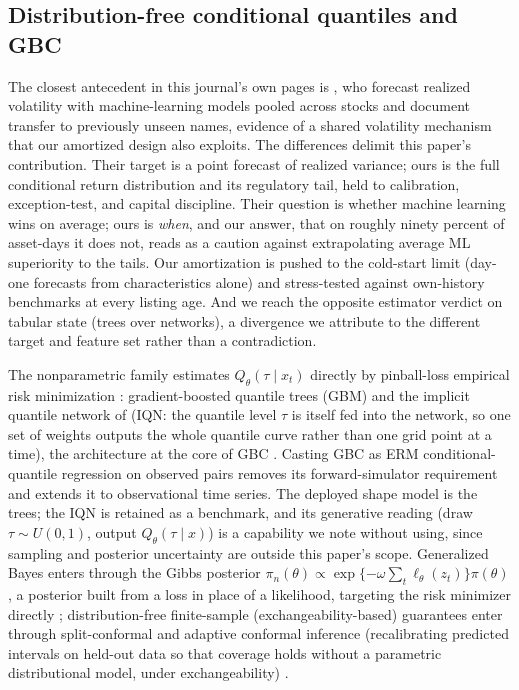 \documentclass[11pt]{article}
\theoremstyle{remark}
\begin{document}
\subsection{Distribution-free conditional quantiles and GBC}

The closest antecedent in this journal's own pages is
\citet{zhang2024commonality}, who forecast realized volatility with
machine-learning models pooled across stocks and document transfer to previously unseen names, evidence of a shared volatility mechanism
that our amortized design also exploits. The differences delimit this
paper's contribution. Their target is a point forecast of realized
variance; ours is the full conditional return distribution and its
regulatory tail, held to calibration, exception-test, and capital
discipline. Their question is whether machine learning wins on average;
ours is \emph{when}, and our answer, that on roughly ninety percent
of asset-days it does not, reads as a caution against extrapolating
average ML superiority to the tails. Our amortization is pushed to the
cold-start limit (day-one forecasts from characteristics alone) and
stress-tested against own-history benchmarks at every listing age. And
we reach the opposite estimator verdict on tabular state (trees over
networks), a divergence we attribute to the different target and feature
set rather than a contradiction.

The nonparametric family estimates $Q_\theta(\tau \mid x_t)$ directly by
pinball-loss empirical risk minimization \citep{koenker1978}:
gradient-boosted quantile
trees (GBM) and the implicit quantile network of \citet{dabney2018iqn}
(IQN: the quantile level $\tau$ is itself fed into the network, so one
set of weights outputs the whole quantile curve rather than one grid
point at a time),
the architecture at the core of GBC \citep{polson2023gbc,
nareklishvili2025gqbp}. Casting GBC as ERM conditional-quantile
regression on observed pairs removes its forward-simulator requirement
and extends it to observational time series. The deployed shape model
is the trees; the IQN is retained as a benchmark, and its generative reading (draw $\tau \sim
U(0,1)$, output $Q_\theta(\tau \mid x)$) is a capability we note
without using, since sampling and posterior uncertainty are outside
this paper's scope. Generalized Bayes enters through the Gibbs
posterior $\pi_n(\theta) \propto
\exp\{-\omega \sum_t \ell_\theta(z_t)\}\pi(\theta)$, a posterior
built from a loss in place of a likelihood, targeting the risk
minimizer directly
\citep{jiang2008gibbs, bissiri2016general}; distribution-free
finite-sample (exchangeability-based) guarantees enter through split-conformal and adaptive
conformal inference (recalibrating predicted intervals on held-out
data so that coverage holds without a parametric distributional
model, under exchangeability)
\citep{gibbs2021aci}.
\end{document}
